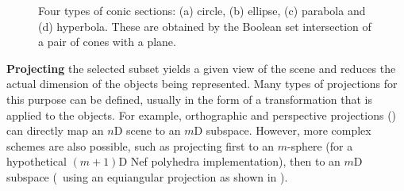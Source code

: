 \begin{figure}[tb]
\centering
{}
\caption[Conic sections]{Four types of conic sections: (a) circle, (b) ellipse, (c) parabola and (d) hyperbola.
These are obtained by the Boolean set intersection of a pair of cones with a plane.}
\label{fig:conic}
\end{figure}

\textbf{Projecting} the selected subset yields a given view of the scene and reduces the actual dimension of the objects being represented.
Many types of projections for this purpose can be defined, usually in the form of a transformation that is applied to the objects.
For example, orthographic and perspective projections () can directly map an $n$D scene to an $m$D subspace.
However, more complex schemes are also possible, such as projecting first to an $m$-sphere (for a hypothetical $(m+1)$D Nef polyhedra implementation), then to an $m$D subspace (\eg\ using an equiangular projection as shown in ).

